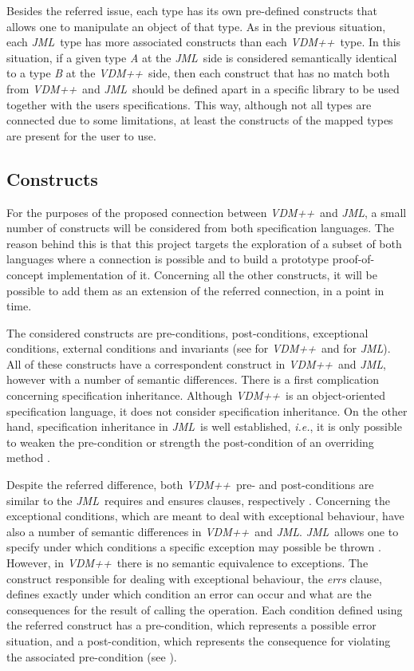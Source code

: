 \documentclass{llncs}
\newcommand{\jml}{\textit{JML}}
\newcommand{\vpp}{\textit{VDM++}}
\newcommand{\ie}{\textit{i.e.}}
\begin{document}
Besides the referred issue, each type has its own pre-defined constructs that allows one to manipulate an object of that type. As in the previous situation, each \jml\ type has more associated constructs than each \vpp\ type. In this situation, if a given type \textit{A} at the \jml\ side is considered semantically identical to a type \textit{B} at the \vpp\ side, then each construct that has no match both from \vpp\ and \jml\ should be defined apart in a specific library to be used together with the users specifications. This way, although not all types are connected due to some limitations, at least the constructs of the mapped types are present for the user to use.

\subsection{Constructs}
\label{constructs}

For the purposes of the proposed connection between \vpp\ and \jml, a small number of constructs will be considered from both specification languages. The reason behind this is that this project targets the exploration of a subset of both languages where a connection is possible and to build a prototype proof-of-concept implementation of it. Concerning all the other constructs, it will be possible to add them as an extension of the referred connection, in a point in time. 

The considered constructs are pre-conditions, post-conditions, exceptional conditions, external conditions and invariants (see \cite{vpplangman} for \vpp\ and \cite{leavens-etal07} for \jml). All of these constructs have a correspondent construct in \vpp\ and \jml, however with a number of semantic differences. There is a first complication concerning specification inheritance. Although \vpp\ is an object-oriented specification language, it does not consider specification inheritance. On the other hand, specification inheritance in \jml\ is well established, \ie, it is only possible to weaken the pre-condition or strength the post-condition of an overriding method \cite{ASVJMLESCJ}.

Despite the referred difference, both \vpp\ pre- and post-conditions are similar to the \jml\ requires and ensures clauses, respectively \cite{vppjmlthesis}. Concerning the exceptional conditions, which are meant to deal with exceptional behaviour, have also a number of semantic differences in \vpp\ and \jml. \jml\ allows one to specify under which conditions a specific exception may possible be thrown \cite{leavens-etal07}. However, in \vpp\ there is no semantic equivalence to exceptions. The construct responsible for dealing with exceptional behaviour, the \textit{errs} clause, defines exactly under which condition an error can occur and what are the consequences for the result of calling the operation. Each condition defined using the referred construct has a pre-condition, which represents a possible error situation, and a post-condition, which represents the consequence for violating the associated pre-condition (see \cite{vppjmlthesis}).
\end{document}
